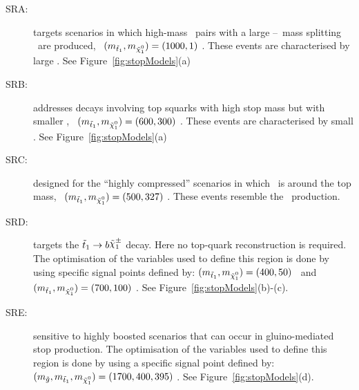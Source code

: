		\begin{description}
		
			\item [SRA:] targets scenarios in which high-mass \stop\ pairs with a large \stop--\ninoone\ mass splitting \dmstopnino\ are produced, \eg\ $(\mstopone, \mninoone) = (1000,1)$ \GeV. These events are characterised by large \met. See Figure~\ref{fig:stopModels}(a)

			\item [SRB:] addresses decays involving top squarks with high stop mass but with smaller \dmstopnino, \eg\ $(\mstopone, \mninoone) = (600, 300)$ \GeV. These events are characterised by small \met. See Figure~\ref{fig:stopModels}(a)

			\item [SRC:] designed for the ``highly compressed'' scenarios in which \dmstopnino\ is around the top mass, \eg\ $(\mstopone, \mninoone) = (500, 327)$ \GeV. These events resemble the \ttbar\ production.

			\item [SRD:] targets the $\stopone \to b \chinoonepm$ decay. Here no top-quark reconstruction is required. The optimisation of the variables used to define this region is done by using specific signal points defined by: $(\mstopone, \mninoone) = (400,50)$ \GeV\ and $(\mstopone, \mninoone) = (700,100)$ \GeV. See Figure~\ref{fig:stopModels}(b)-(c).
			
			\item [SRE:] sensitive to highly boosted scenarios that can occur in gluino-mediated stop production. The optimisation of the variables used to define this region is done by using a specific signal point defined by: $(\mgluino, \mstopone, \mninoone) = (1700, 400, 395)$ \GeV. See Figure~\ref{fig:stopModels}(d).

		\end{description}
